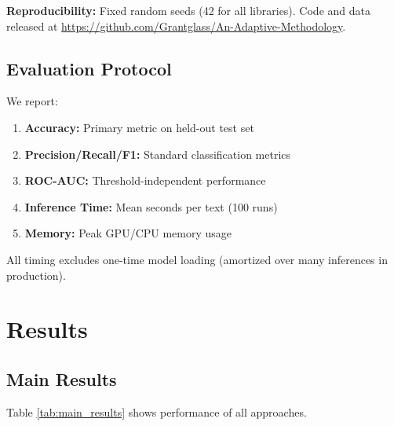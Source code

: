 \documentclass[11pt]{article}
\begin{document}
\textbf{Reproducibility:} Fixed random seeds (42 for all libraries). Code and data released at \url{https://github.com/Grantglass/An-Adaptive-Methodology}.

\subsection{Evaluation Protocol}

We report:

\begin{enumerate}
    \item \textbf{Accuracy:} Primary metric on held-out test set
    \item \textbf{Precision/Recall/F1:} Standard classification metrics
    \item \textbf{ROC-AUC:} Threshold-independent performance
    \item \textbf{Inference Time:} Mean seconds per text (100 runs)
    \item \textbf{Memory:} Peak GPU/CPU memory usage
\end{enumerate}

All timing excludes one-time model loading (amortized over many inferences in production).

\section{Results}

\subsection{Main Results}

Table \ref{tab:main_results} shows performance of all approaches.
\end{document}
